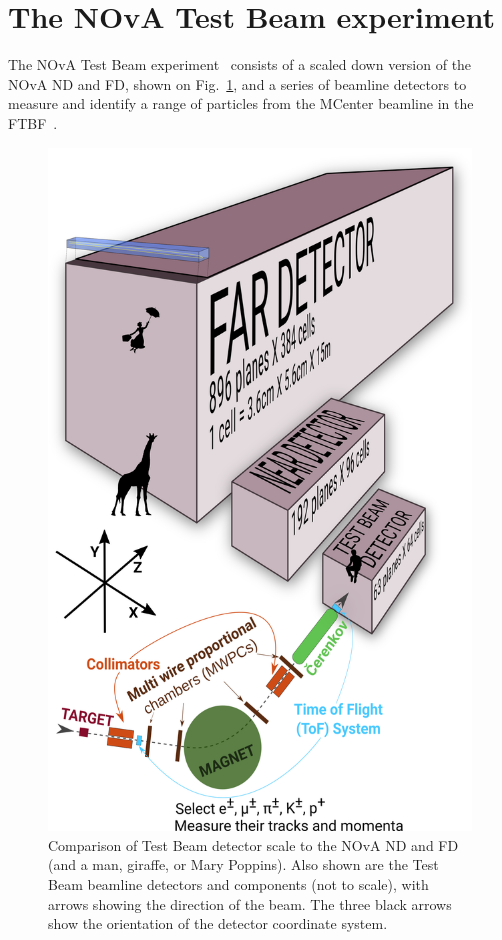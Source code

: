 \section{The NOvA Test Beam experiment}\label{sec:TBExperiment}

The \gls{NOvA} Test Beam experiment~\cite{NOvA-doc-22172} consists of a scaled down version of the \gls{NOvA} \gls{ND} and \gls{FD}, shown on Fig.~\ref{fig:TBDetector}, and a series of beamline detectors to measure and identify a range of particles from the MCenter beamline in the \gls{FTBF}~\cite{FTBFWebsite}.

\begin{figure}[!ht]
\centering
\includegraphics[width=.7\textwidth]{Plots/TBCalibration/TestBeamDetectorWithArrows.png}
\caption{Comparison of Test Beam detector scale to the \acrshort{NOvA} \acrshort{ND} and \acrshort{FD} (and a man, giraffe, or Mary Poppins). Also shown are the Test Beam beamline detectors and components (not to scale), with arrows showing the direction of the beam. The three black arrows show the orientation of the detector coordinate system.}
\label{fig:TBDetector}
\end{figure}

